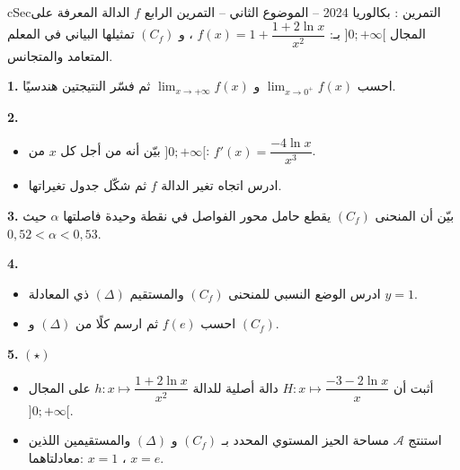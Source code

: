 \documentclass[12pt,a4paper]{article}
\newenvironment{BOX}[2]{\begin{otherlanguage}{english}\begin{arbox}{#1}{#2}}{\end{arbox}\end{otherlanguage}}
\newcounter{exo}
\newenvironment{tamrin}[1]{\stepcounter{exo}\begin{BOX}{cSec}{التمرين \theexo: #1}}{\end{BOX}}
\newenvironment{sq}{\begin{itemize}[leftmargin=2.4em,itemsep=3pt]}{\end{itemize}}
\newcommand{\qa}{\item[(أ)]}\newcommand{\qb}{\item[(ب)]}\newcommand{\qc}{\item[(جـ)]}\newcommand{\qd}{\item[(د)]}\newcommand{\qe}{\item[(هـ)]}
\newcommand{\QQ}[1]{\par\smallskip\textbf{#1.} }
\newcommand{\Lm}[1]{\displaystyle\lim_{x\to#1}}
\begin{document}
\begin{tamrin}{بكالوريا 2024 -- الموضوع الثاني -- التمرين الرابع}
$f$ الدالة المعرفة على المجال $]0;+\infty[$ بـ: $f(x)=1+\dfrac{1+2\ln x}{x^2}$ ، و $(C_f)$ تمثيلها البياني في المعلم المتعامد والمتجانس.
\QQ{1} احسب $\Lm{0^+}f(x)$ و $\Lm{+\infty}f(x)$ ثم فسّر النتيجتين هندسيًا.
\QQ{2}
\begin{sq}
\qa بيّن أنه من أجل كل $x$ من $]0;+\infty[$: $f'(x)=\dfrac{-4\ln x}{x^3}$.
\qb ادرس اتجاه تغير الدالة $f$ ثم شكّل جدول تغيراتها.
\end{sq}
\QQ{3} بيّن أن المنحنى $(C_f)$ يقطع حامل محور الفواصل في نقطة وحيدة فاصلتها $\alpha$ حيث $0{,}52<\alpha<0{,}53$.
\QQ{4}
\begin{sq}
\qa ادرس الوضع النسبي للمنحنى $(C_f)$ والمستقيم $(\Delta)$ ذي المعادلة $y=1$.
\qb احسب $f(e)$ ثم ارسم كلًا من $(\Delta)$ و $(C_f)$.
\end{sq}
\QQ{5} $(\star)$
\begin{sq}
\qa أثبت أن $H:x\mapsto\dfrac{-3-2\ln x}x$ دالة أصلية للدالة $h:x\mapsto\dfrac{1+2\ln x}{x^2}$ على المجال $]0;+\infty[$.
\qb استنتج $\mathcal A$ مساحة الحيز المستوي المحدد بـ $(C_f)$ و $(\Delta)$ والمستقيمين اللذين معادلتاهما: $x=1$ ، $x=e$.
\end{sq}
\end{tamrin}
\end{document}
